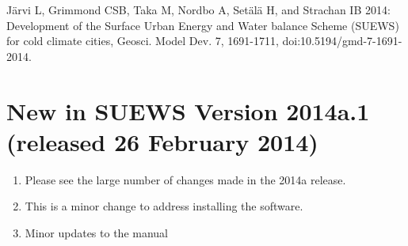 \documentclass[letterpaper,10pt,english]{sphinxmanual}
\begin{document}
Järvi L, Grimmond CSB, Taka M, Nordbo A, Setälä H, and Strachan IB 2014:
Development of the Surface Urban Energy and Water balance Scheme (SUEWS)
for cold climate cities, Geosci. Model Dev. 7, 1691-1711,
doi:10.5194/gmd-7-1691-2014.


\section{New in SUEWS Version 2014a.1 (released 26 February 2014)}
\label{\detokenize{version-history:new-in-suews-version-2014a-1-released-26-february-2014}}\begin{enumerate}
\item {} 
Please see the large number of changes made in the 2014a release.

\item {} 
This is a minor change to address installing the software.

\item {} 
Minor updates to the manual

\end{enumerate}
\end{document}
